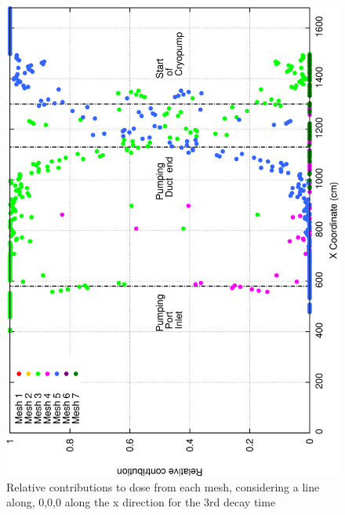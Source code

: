 \documentclass[12pt]{article}
\begin{document}
\begin{figure}[ht!]
\centering
\includegraphics[clip,scale=0.25]{../plots/crosstalk/b4c/lp/dc3_rel.png}
\caption{Relative contributions to dose from each mesh, considering a line along, 0,0,0 along the x direction for the 3rd decay time}
\label{fig:b4c_ct_lp_dc3_rel}
\end{figure}

\end{document}
